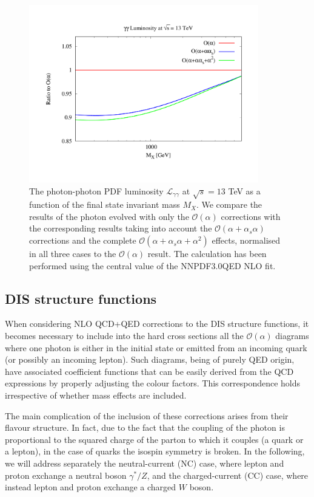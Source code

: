 \begin{figure}[t]
\includegraphics[width=10cm]{figs/lumi_13tev.pdf} 
\caption{The photon-photon PDF luminosity $\mathcal{L}_{\gamma\gamma}$ at $\sqrt{s} = 13$ TeV as a
  function of the final state invariant mass $M_X$.
  We compare the results of the photon evolved
  with only the $\mathcal{O}(\alpha)$ corrections
  with the corresponding results taking into account the 
  $\mathcal{O}(\alpha+\alpha_s\alpha)$ corrections
  and the complete
  $\mathcal{O}(\alpha+\alpha_s\alpha+\alpha^2)$ effects,
  normalised in all three cases to the $\mathcal{O}(\alpha)$ result.
  The calculation has been performed using the central value of the NNPDF3.0QED NLO
  fit.  }
\label{fig:GammaGammaLumi}
\end{figure}

\subsection{DIS structure functions}

When considering NLO QCD+QED corrections to the DIS structure
functions, it becomes necessary to include into the hard cross
sections all the $\mathcal{O}(\alpha)$ diagrams where one photon is
either in the initial state or emitted from an incoming quark (or
possibly an incoming lepton).
%
Such diagrams, being of purely QED origin, have associated coefficient
functions that can be easily derived from the QCD expressions by
properly adjusting the colour factors.
%
This correspondence holds irrespective of whether mass effects are
included.

The main complication of the inclusion of these corrections arises
from their flavour structure. In fact, due to the fact that the
coupling of the photon is proportional to the squared charge of the
parton to which it couples (a quark or a lepton), in the case of
quarks the isospin symmetry is broken.
%
In the following, we will address separately the neutral-current (NC)
case, where lepton and proton exchange a neutral boson $\gamma^*/Z$,
and the charged-current (CC) case, where instead lepton and proton
exchange a charged $W$ boson.

